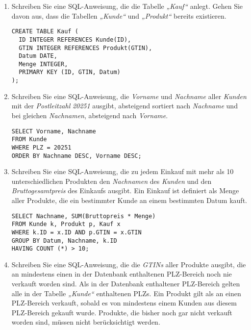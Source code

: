 \documentclass{lehramt-informatik-minimal}
\begin{document}
\begin{enumerate}


\item Schreiben Sie eine SQL-Anweisung, die die Tabelle \emph{„Kauf“}
anlegt. Gehen Sie davon aus, dass die Tabellen \emph{„Kunde“} und
\emph{„Produkt“} bereits existieren.

\begin{antwort}[muster]
\begin{verbatim}
CREATE TABLE Kauf (
  ID INTEGER REFERENCES Kunde(ID),
  GTIN INTEGER REFERENCES Produkt(GTIN),
  Datum DATE,
  Menge INTEGER,
  PRIMARY KEY (ID, GTIN, Datum)
);
\end{verbatim}
\end{antwort}


\item Schreiben Sie eine SQL-Anweisung, die \emph{Vorname} und
\emph{Nachname} aller \emph{Kunden} mit der \emph{Postleitzahl}
\emph{20251} ausgibt, absteigend sortiert nach \emph{Nachname} und bei
gleichen \emph{Nachnamen}, absteigend nach \emph{Vorname}.

\begin{antwort}[muster]
\begin{verbatim}
SELECT Vorname, Nachname
FROM Kunde
WHERE PLZ = 20251
ORDER BY Nachname DESC, Vorname DESC;
\end{verbatim}
\end{antwort}


\item Schreiben Sie eine SQL-Anweisung, die zu jedem Einkauf mit mehr
als 10 unterschiedlichen Produkten den \emph{Nachnamen} des
\emph{Kunden} und den \emph{Bruttogesamtpreis} des Einkaufs ausgibt. Ein
Einkauf ist definiert als Menge aller Produkte, die ein bestimmter Kunde
an einem bestimmten Datum kauft.

\begin{antwort}[muster]
\begin{verbatim}
SELECT Nachname, SUM(Bruttopreis * Menge)
FROM Kunde k, Produkt p, Kauf x
WHERE k.ID = x.ID AND p.GTIN = x.GTIN
GROUP BY Datum, Nachname, k.ID
HAVING COUNT (*) > 10;
\end{verbatim}
\end{antwort}


\item Schreiben Sie eine SQL-Anweisung, die die \emph{GTINs} aller
Produkte ausgibt, die an mindestens einen in der Datenbank enthaltenen
PLZ-Bereich noch nie verkauft worden sind. Als in der Datenbank
enthaltener PLZ-Bereich gelten alle in der Tabelle \emph{„Kunde“}
enthaltenen PLZs. Ein Produkt gilt als an einen PLZ-Bereich verkauft,
sobald es von mindestens einem Kunden aus diesem PLZ-Bereich gekauft
wurde. Produkte, die bisher noch gar nicht verkauft worden sind, müssen
nicht berücksichtigt werden.


\end{enumerate}
\end{document}
